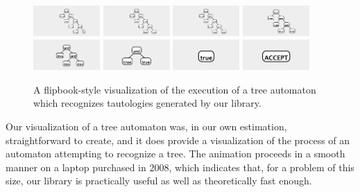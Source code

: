 \documentclass{article}
\begin{document}
\begin{figure}
\begin{center}
\includegraphics[width=1in]{../board/pics/ss1451.png}
\includegraphics[width=1in]{../board/pics/ss1501.png}
\includegraphics[width=1in]{../board/pics/ss1551.png}
\includegraphics[width=1in]{../board/pics/ss1601.png}
\includegraphics[width=1in]{../board/pics/ss1651.png}
\includegraphics[width=1in]{../board/pics/ss1701.png}
\includegraphics[width=1in]{../board/pics/ss1751.png}
\includegraphics[width=1in]{../board/pics/ss1801.png}
\end{center}
\caption{A flipbook-style visualization of the execution of a tree automaton which recognizes tautologies generated by our library.}
\label{fig:auto}
\end{figure}

Our visualization of a tree automaton was, in our own estimation,
straightforward to create, and it does provide a visualization of the process
of an automaton attempting to recognize a tree.  The animation proceeds in a smooth manner on a laptop purchased in 2008, which indicates that, for a problem of this size, our library is practically useful as well as theoretically fast enough.
\end{document}
